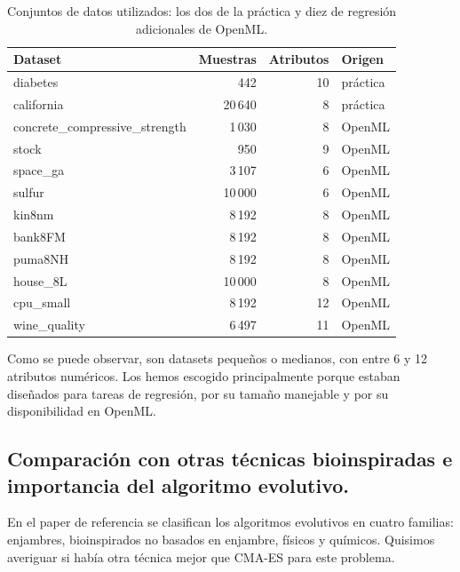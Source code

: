 \begin{table}[h]
\centering
\begin{tabular}{lrrl}
\hline
\textbf{Dataset} & \textbf{Muestras} & \textbf{Atributos} & \textbf{Origen} \\
\hline
diabetes                                 & 442        & 10 & práctica \\
california                               & 20\,640    & 8  & práctica \\
\hline
concrete\_compressive\_strength          & 1\,030     & 8  & OpenML \\
stock                                    & 950        & 9  & OpenML \\
space\_ga                                & 3\,107     & 6  & OpenML \\
sulfur                                   & 10\,000    & 6  & OpenML \\
kin8nm                                   & 8\,192     & 8  & OpenML \\
bank8FM                                  & 8\,192     & 8  & OpenML \\
puma8NH                                  & 8\,192     & 8  & OpenML \\
house\_8L                                & 10\,000    & 8  & OpenML \\
cpu\_small                               & 8\,192     & 12 & OpenML \\
wine\_quality                            & 6\,497     & 11 & OpenML \\
\hline
\end{tabular}
\caption{Conjuntos de datos utilizados: los dos de la práctica y diez de regresión adicionales de OpenML.}
\label{tab:datasets}
\end{table}

Como se puede observar, son datasets pequeños o medianos, con entre 6 y 12 atributos numéricos. Los hemos escogido principalmente porque estaban diseñados para tareas de regresión, por su tamaño manejable y por su disponibilidad en OpenML. 

\subsection{Comparación con otras técnicas bioinspiradas e importancia del algoritmo evolutivo.}

En el paper de referencia se clasifican los algoritmos evolutivos en cuatro familias: enjambres, bioinspirados no basados en enjambre, físicos y químicos. Quisimos averiguar si había otra técnica mejor que CMA-ES para este problema. 


